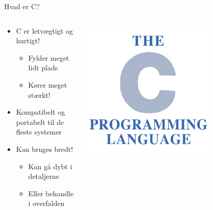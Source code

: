 \documentclass{beamer}
\begin{document}
\begin{frame}{Hvad er C?}
	\begin{columns}
	
		\begin{column}{0.5\textwidth}
		\begin{itemize}
		\item {C er letvægtigt og hurtigt!}
			\begin{itemize}
			\item{Fylder meget lidt plads}
			\item{Kører meget stærkt!}
			\end{itemize}
		\item {Kompatibelt og portabelt til de fleste systemer}
		\item {Kan bruges bredt!}
			\begin{itemize}
			\item {Kan gå dybt i detaljerne}
			\item {Eller behandle i overfalden}
			\end{itemize}
		\end{itemize}
		\end{column}
		
		\begin{column}{0.5\textwidth}
		\begin{center}
     		\includegraphics[width=0.7\textwidth]{assets/The_C_Programming_Language_logo.png}
     	\end{center}
		\end{column}
		
	\end{columns}
\end{frame}
\end{document}
